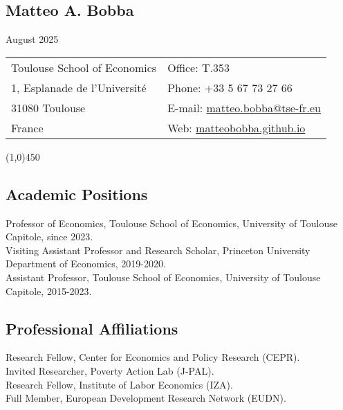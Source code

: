 \documentclass[12pt,english]{article}
\begin{document}


\noindent
\begin{center}
\section*{Matteo A. Bobba} \vspace{-0.3cm}
August 2025
\end{center} 
\begin{tabular}{p{9cm}p{9cm}}
Toulouse School of Economics &  Office: T.353  \\ 
1, Esplanade de l'Universit\'{e} & Phone: +33 5 67 73 27 66\\
31080 Toulouse  &  E-mail: \href{mailto: matteo.bobba@tse-fr.eu}{matteo.bobba@tse-fr.eu} \\
France & Web: \href{https://matteobobba.github.io/}{matteobobba.github.io}  \\
\end{tabular}
\vspace{-0.1cm}
\line(1,0){450} \\
\vspace{-0.3cm}

\subsection*{Academic Positions}
Professor of Economics, Toulouse School of Economics, University of Toulouse Capitole, since 2023. \vspace{0.2cm} \\ 
Visiting Assistant Professor and Research Scholar, Princeton University Department of Economics, 2019-2020. \vspace{0.2cm} \\
Assistant Professor, Toulouse School of Economics, University of Toulouse Capitole, 2015-2023. 

\subsection*{Professional Affiliations}
Research Fellow, Center for Economics and Policy Research (CEPR).\vspace{0.2cm} \\
Invited Researcher, Poverty Action Lab (J-PAL). \vspace{0.2cm} \\ 
Research Fellow, Institute of Labor Economics (IZA). \vspace{0.2cm} \\ 
Full Member, European Development Research Network (EUDN).
\end{document}
